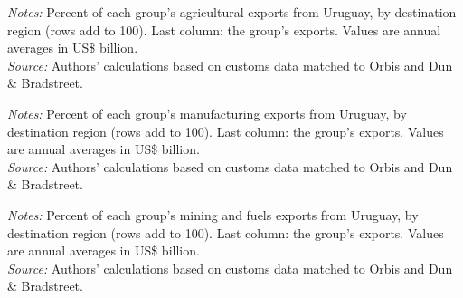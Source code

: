 \documentclass[11pt,a4paper]{article}
\begin{document}
\begin{table}[H]\centering\small%
  \caption{Uruguay, Agriculture: Multinational Exports by Parent Region and Destination Region}%
  \label{tab:c_reg_URY_agro}%
  \par\vspace{3pt}%
  \begin{minipage}{0.95\textwidth}\footnotesize %
  \textit{Notes:} Percent of each group's agricultural exports from Uruguay, by destination region (rows add to 100). Last column: the group's exports. Values are annual averages in US\$ billion.\\[3pt]%
  \textit{Source:} Authors' calculations based on customs data matched to Orbis and Dun \& Bradstreet.%
  \end{minipage}%
  \end{table}
\begin{table}[H]\centering\small%
  \caption{Uruguay, Manufacturing: Multinational Exports by Parent Region and Destination Region}%
  \label{tab:c_reg_URY_manufacturing}%
  \par\vspace{3pt}%
  \begin{minipage}{0.95\textwidth}\footnotesize %
  \textit{Notes:} Percent of each group's manufacturing exports from Uruguay, by destination region (rows add to 100). Last column: the group's exports. Values are annual averages in US\$ billion.\\[3pt]%
  \textit{Source:} Authors' calculations based on customs data matched to Orbis and Dun \& Bradstreet.%
  \end{minipage}%
  \end{table}
\begin{table}[H]\centering\small%
  \caption{Uruguay, Mining and Fuels: Multinational Exports by Parent Region and Destination Region}%
  \label{tab:c_reg_URY_mining}%
  \par\vspace{3pt}%
  \begin{minipage}{0.95\textwidth}\footnotesize %
  \textit{Notes:} Percent of each group's mining and fuels exports from Uruguay, by destination region (rows add to 100). Last column: the group's exports. Values are annual averages in US\$ billion.\\[3pt]%
  \textit{Source:} Authors' calculations based on customs data matched to Orbis and Dun \& Bradstreet.%
  \end{minipage}%
  \end{table}
\end{document}
